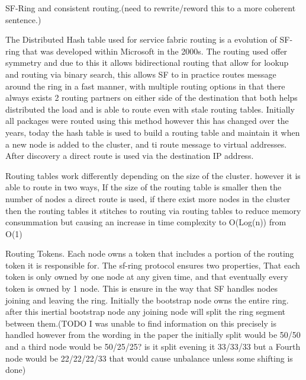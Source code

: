 \documentclass[a4paper,10pt,titlepage]{report}
\begin{document}
SF-Ring and consistent routing.(need to rewrite/reword this to a more coherent sentence.)

The Distributed Hash table used for service fabric routing is a evolution of SF-ring that was developed within Microsoft in the 2000s. The routing used offer symmetry and due to this it allows bidirectional routing that allow for lookup and routing via binary search, this allows SF to in practice routes message around the ring in a fast manner, with multiple routing options in that there always exists 2 routing partners on either side of the destination that both helps distributed the load and is able to route even with stale routing tables. Initially all packages were routed using this method however this has changed over the years, today the hash table is used to build a routing table and maintain it when a new node is added to the cluster, and ti route message to virtual addresses. After discovery a direct route is used via the destination IP address. \\
\vspace{5mm}

Routing tables work differently depending on the size of the cluster. however it is able to route in two ways, If the size of the routing table is smaller then the number of nodes a direct route is used, if there exist more nodes in the cluster then the routing tables it stitches to routing via routing tables to reduce memory consummation but causing an increase in time complexity to O(Log(n)) from O(1)\\
\vspace{5mm}

Routing Tokens.
Each node owns a token that includes a portion of the routing token it is responsible for. The sf-ring protocol ensures two properties, That each token is only owned by one node at any given time, and that eventually every token is owned by 1 node. This is ensure in the way that SF handles nodes joining and leaving the ring. Initially the bootstrap node owns the entire ring. after this inertial bootstrap node any joining node will split the ring segment between them.(TODO I was unable to find information on this precisely is handled however from the wording in the paper the initially split would be 50/50 and a third node would be 50/25/25?  is it split evening it 33/33/33 but a Fourth node would be 22/22/22/33 that would cause unbalance unless some shifting is done)\\
\vspace{5mm}
\end{document}
